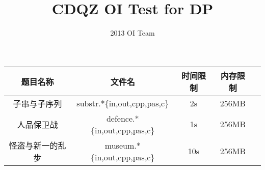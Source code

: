 \documentclass[a4paper]{article}
\begin{document}
\title{CDQZ OI Test for DP}
\author{2013 OI Team}
\maketitle
\begin{center}
\begin{tabular}{|c|c|c|c|c|}
\hline
题目名称 & 文件名 & 时间限制 & 内存限制 \\ \hline
子串与子序列 & substr.*\{in,out,cpp,pas,c\} & 2s & 256MB\\ \hline
人品保卫战 & defence.*\{in,out,cpp,pas,c\} & 1s & 256MB \\ \hline
怪盗与新一的乱步 & museum.*\{in,out,cpp,pas,c\} & 10s & 256MB \\ \hline
\end{tabular}
\end{center}
\tableofcontents




\end{document}
